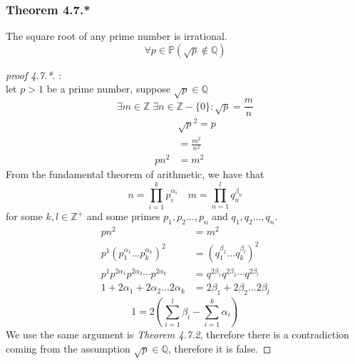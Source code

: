 \documentclass[12pt]{book}
\newcommand{\Z}{\mathbb{Z}}
\newcommand{\Q}{\mathbb{Q}}
\newcommand{\paren}[1]{\left( #1 \right)}
\newcommand{\zero}{\{0\}}
\begin{document}
\newpage
\subsubsection{Theorem 4.7.*}
The square root of any prime number is irrational.
\[
\forall p \in \mathbb{P} \paren{ \sqrt{p} \notin \Q}
\]
\begin{proof}[proof 4.7.*]:\\
let $p > 1$ be a prime number, suppose $\sqrt{p} \in \Q$\\
\[
\exists m \in \Z\; \exists n \in \Z - \zero : \sqrt{p} = \frac{m}{n}
\]
\begin{align*}
    &\sqrt{p}^2 = p \\
    &= \frac{m^2}{n^2}\\
    pn^2&=m^2
\end{align*}
From the fundamental theorem of arithmetic, we have that
\[
n = \prod_{i=1}^{k} p_i^{\alpha_i} \quad 
m = \prod_{n=1}^{l} q_n^{\beta_n} 
\]
for some $k,l \in \Z^+$ and some primes $p_1, p_2 \ldots,p_n$ and $q_1, q_2 \ldots,q_n$.
\begin{align*}
    pn^2 &= m^2\\
    p^1 \paren{p_1^{\alpha_1} \ldots p_k^{\alpha_k}}^2 &=
    \paren{q_1^{\beta_1} \ldots q_k^{\beta_l}}^2\\
    p^1 p^{2\alpha_1} p^{2\alpha_2} \cdots p^{2\alpha_k} &=
    q^{2\beta_1}q^{2\beta_2}\cdots q^{2\beta_l}
    \\
    1 + 2 \alpha_1 + 2 \alpha_2 \ldots 2\alpha_k &=
    2\beta_1 + 2\beta_2 \ldots 2 \beta_l
\end{align*}
\[
1 = 2 \paren{ \sum_{i=1}^{l} \beta_i - \sum_{i=1}^{k} \alpha_i}
\]
We use the same argument is \textit{Theorem 4.7.2}, therefore there is a contradiction coming from the assumption $\sqrt{p}\in \Q$, therefore it is false.


\end{proof}

\newpage
\end{document}
